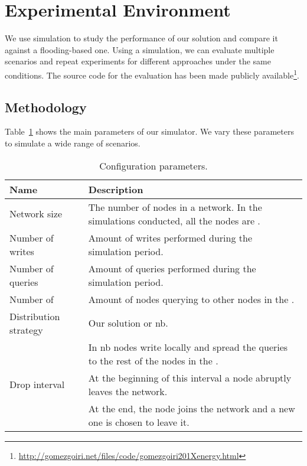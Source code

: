 \section{Experimental Environment}
\label{environment}
We use simulation to study the performance of our solution and compare it against a flooding-based one.
Using a simulation, we can evaluate multiple scenarios and repeat experiments for different approaches under the same conditions.
The source code for the evaluation has been made publicly available\footnote{\url{http://gomezgoiri.net/files/code/gomezgoiri201Xenergy.html}}.

\subsection{Methodology}
Table~\ref{tab:configurationParameters} shows the main parameters of our simulator.
We vary these parameters to simulate a wide range of scenarios.


\begin{table}
  \centering
    \begin{tabular}{l p{8cm}}
      \hline
      Name & Description \\
      \hline
      Network size & The number of nodes in a network. In the simulations conducted, all the nodes are \providers{}. \\
      Number of writes & Amount of writes performed during the simulation period. \\
      Number of queries & Amount of queries performed during the simulation period. \\
      Number of \consumers{} & Amount of nodes querying to other nodes in the \Space{}. \\
      Distribution strategy & Our solution or \ac{nb}. \\
      & In \ac{nb} nodes write locally and spread the queries to the rest of the nodes in the \Space{}. \\
      Drop interval & At the beginning of this interval a node abruptly leaves the network. \\
      & At the end, the node joins the network and a new one is chosen to leave it. \\
      \hline
    \end{tabular}
    \caption {Configuration parameters.}
  \label{tab:configurationParameters}
\end{table}

